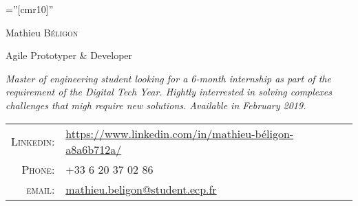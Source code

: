 \documentclass[a4paper,10pt]{article}
\begin{document}

\pagestyle{empty} %

\font\fb=''[cmr10]'' %

\par{\centering
    {\Huge Mathieu \textsc{Béligon}
  }\bigskip\par}
\par{\centering
    {\large Agile Prototyper \& Developer}\par}


\begin{center}
  \textit{Master of engineering student looking for a 6-month internship as part of the requirement of the Digital Tech Year. Hightly interrested in solving complexes challenges that migh require new solutions. Available in February 2019.}
\end{center}

\begin{tabular}{rl}
    \textsc{Linkedin:}   & \href{https://www.linkedin.com/in/mathieu-béligon-a8a6b712a/}{https://www.linkedin.com/in/mathieu-béligon-a8a6b712a/} \\
    \textsc{Phone:}     & +33 6 20 37 02 86\\
    \textsc{email:}     & \href{mailto:mathieu.beligon@student.ecp.fr}{mathieu.beligon@student.ecp.fr}
\end{tabular}


\end{document}
